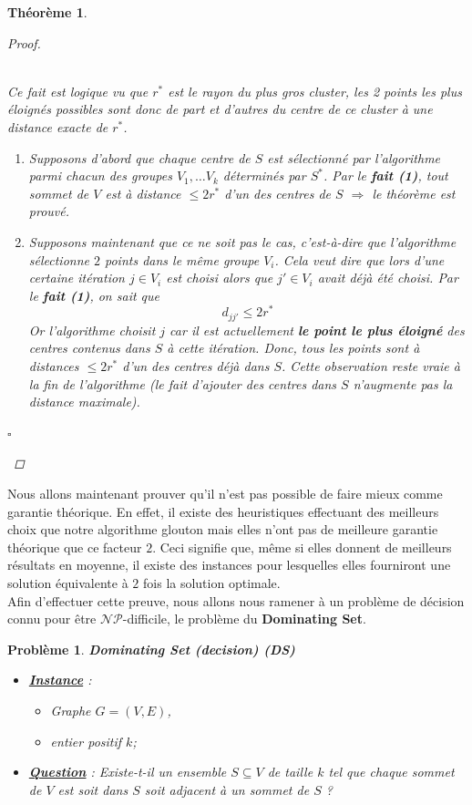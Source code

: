 \documentclass{article}
\newcommand{\titre}[1]{\textcolor{title}{#1}}
\newcommand{\cqfd}{\begin{flushright}$\square$\end{flushright}}
\newtheorem{thm}{Th\'eor\`eme}[section]
\newtheorem{pbm}{Problème}[section]
\newtheorem{proof}{Preuve}[section]
\newenvironment{pblm}{\hbox{\raisebox{0.4em}{\vrule depth 1pt height 0.4pt width 5cm}}\begin{pbm}}
{\end{pbm}\hbox{\raisebox{0.4em}{\vrule depth 1pt height 0.4pt width 5cm}}}
\begin{document}
\begin{sffamily}
\begin{thm}
\begin{proof}
\begin{itemize}
$ $\\Ce fait est logique vu que $r^*$ est le rayon du plus gros cluster, les 2 points les plus éloignés possibles sont donc de part et 
d'autres  du centre de ce cluster à une distance exacte de $r^*$.
\begin{enumerate}
\item Supposons d'abord que chaque centre de $S$ est sélectionné par l'algorithme parmi chacun des groupes $V_1,\ldots V_k$ déterminés 
par $S^*$. Par le \textbf{fait (1)}, tout sommet de $V$ est à distance $\leq 2r^*$ d'un des centres de $S$ $\Rightarrow$ le théorème est 
prouvé.
\item Supposons maintenant que ce ne soit pas le cas, c'est-à-dire que l'algorithme sélectionne $2$ points dans le même groupe $V_i$. 
Cela veut dire que lors d'une certaine itération $j\in V_i$ est choisi alors que $j'\in V_i$ avait déjà été choisi. Par le \textbf{fait 
(1)}, on sait que $$d_{jj'} \leq 2r^*$$ 
Or l'algorithme choisit $j$ car il est actuellement \textbf{le point le plus éloigné} des centres contenus dans $S$ à cette itération. 
Donc, tous les points sont à distances $\leq 2r^*$ d'un des centres déjà dans $S$. Cette observation reste vraie à la fin de l'algorithme 
(le fait d'ajouter des centres dans $S$ n'augmente pas la distance maximale).
\end{enumerate}
\end{itemize}
\cqfd
\end{proof}
\end{thm}

Nous allons maintenant prouver qu'il n'est pas possible de faire mieux comme garantie théorique. En effet, il existe des heuristiques 
effectuant des meilleurs choix que notre algorithme glouton mais elles n'ont pas de meilleure garantie théorique que ce facteur $2$. Ceci 
signifie que, même si elles donnent de meilleurs résultats en moyenne, il existe des instances pour lesquelles elles fourniront une 
solution équivalente à $2$ fois la solution optimale. \\
Afin d'effectuer cette preuve, nous allons nous ramener à un problème de décision connu pour être $\mathcal{NP}$-difficile, le problème 
du \textbf{Dominating Set}.

\begin{pblm}
\textbf{Dominating Set (decision) (\titre{DS})}
\begin{itemize}
\item[*]\textbf{\underline{Instance}} :
\begin{itemize}
\item Graphe $G=(V,E)$,
\item entier positif $k$;
\end{itemize}
\item[*]\textbf{\underline{Question}} : Existe-t-il un ensemble $S\subseteq V$ de taille $k$ tel que chaque sommet de $V$ est soit dans 
$S$ soit adjacent à un sommet de $S$ ?
\end{itemize}
\end{pblm}


\end{sffamily}
\end{document}
